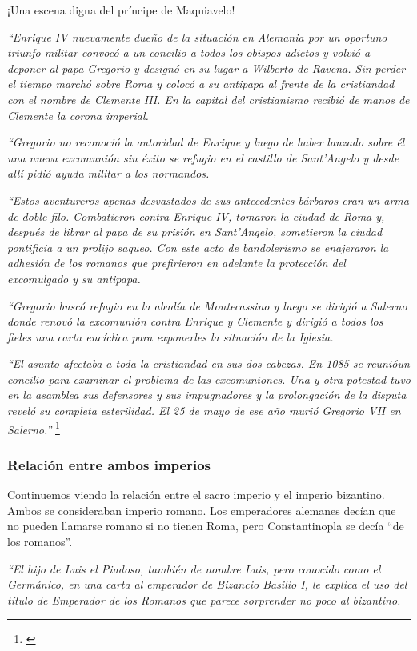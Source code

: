 ¡Una escena digna del príncipe de Maquiavelo!

\textit{
	``Enrique IV nuevamente dueño de la situación en Alemania por
	un oportuno triunfo militar convocó a un concilio a todos
	los obispos adictos y volvió a deponer al papa Gregorio
	y designó en su lugar a Wilberto de Ravena. Sin perder
	el tiempo marchó sobre Roma y colocó a su antipapa al frente
	de la cristiandad con el nombre de Clemente III.
	En la capital del cristianismo recibió de manos de Clemente
	la corona imperial.
}

\textit{
	``Gregorio no reconoció la autoridad de Enrique y luego
	de haber lanzado sobre él una nueva excomunión sin éxito
	se refugio en el castillo de Sant'Angelo y desde allí
	pidió ayuda militar a los normandos.
}

\textit{
	``Estos aventureros apenas desvastados de sus antecedentes
	bárbaros eran un arma de doble filo. Combatieron contra
	Enrique IV, tomaron la ciudad de Roma y, después de librar
	al papa de su prisión en Sant'Angelo, sometieron la ciudad
	pontificia a un prolijo saqueo. Con este acto de bandolerismo
	se enajeraron la adhesión de los romanos que prefirieron
	en adelante la protección del excomulgado y su antipapa.
}

\textit{
	``Gregorio buscó refugio en la abadía de Montecassino y luego
	se dirigió a Salerno donde renovó la excomunión contra
	Enrique y Clemente y dirigió a todos los fieles una carta
	encíclica para exponerles la situación de la Iglesia.
}

\textit{
	``El asunto afectaba a toda la cristiandad en sus dos cabezas.
	En 1085 se reunióun concilio para examinar el problema
	de las excomuniones. Una y otra potestad tuvo en la
	asamblea sus defensores y sus impugnadores y la prolongación
	de la disputa reveló su completa esterilidad. El 25 de mayo de
	ese año murió Gregorio VII en Salerno.''
}\footnote{\cite[p.~871--872]{ciudad}}

\subsubsection{Relación entre ambos imperios}

Continuemos viendo la relación entre el sacro imperio y
el imperio bizantino. Ambos se consideraban imperio romano.
Los emperadores alemanes decían que no pueden llamarse romano
si no tienen Roma, pero Constantinopla se decía ``de los
romanos''.

\textit{``El hijo de Luis el Piadoso, también de nombre Luis,
	pero conocido como el Germánico, en una carta al
	emperador de Bizancio Basilio I, le explica el uso del
	título de Emperador de los Romanos que parece sorprender
	no poco al bizantino.}

